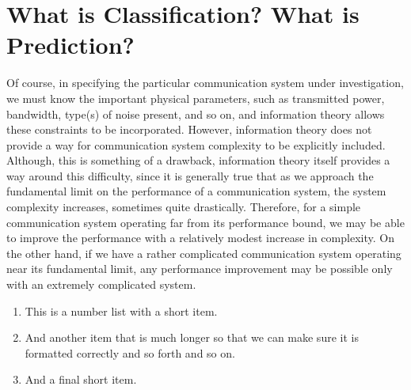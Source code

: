 \section{What is Classification? What is Prediction?}

Of course, in specifying the particular communication system under
investigation, we must know the important physical parameters,
such as transmitted
power, bandwidth, type(s) of noise present, and so on,
and information theory allows these constraints to be incorporated.
However, information theory does not provide a way for communication system
complexity to be explicitly included.
Although, this is something of a drawback, information theory itself provides
a way around this difficulty, since it is generally true that as we approach
the fundamental limit on the performance of a communication system,
the system complexity increases, sometimes quite drastically.
Therefore, for a simple communication system operating far
from its performance bound, we may be able to improve the performance
with a relatively modest increase in complexity.
On the other hand, if we have a rather complicated communication system
operating near its fundamental limit, any performance improvement may
be possible only with an extremely complicated system.
\begin{enumerate}
\item This is a number list with a short item.
\item And another item that is much longer so that we can make sure it is
formatted correctly and so forth and so on.
\item And a final short item.
\end{enumerate}
